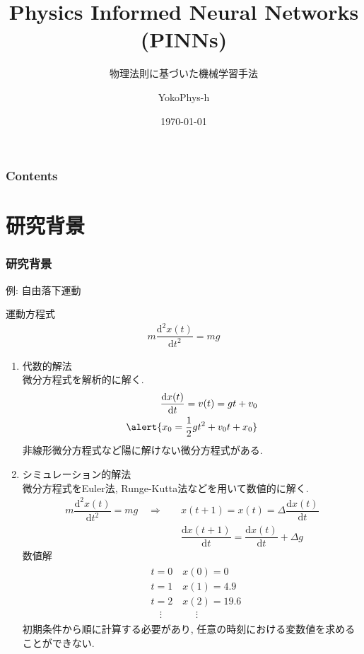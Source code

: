 \documentclass[xcolor=dvipsnames,hyperref={breaklinks=true},mathserif,professionalfont,dvipdfmx,12pt]{beamer}
\title{Physics Informed Neural Networks (PINNs)}
\subtitle{物理法則に基づいた機械学習手法}
\author{YokoPhys-h}
\date{\today}
\institute{hoge大学大学院}
\begin{document}
\begin{frame}[plain]
  \titlepage
\end{frame}
\begin{frame}
  \frametitle{Contents}
  \tableofcontents
\end{frame}

\section{研究背景}

\begin{frame}
  \frametitle{研究背景}
  例: 自由落下運動\cite{_HuaTinoNVIDIASimNetDemoShiwareteiruPhysicsInformed_}

  運動方程式
  \begin{align*}
    m\dfrac{\mathrm{d}^2 x(t)}{\mathrm{d}t^2}=mg
  \end{align*}
  \vspace{-22pt}
  \begin{enumerate}
    \item 代数的解法\\
    微分方程式を解析的に解く. 
    \begin{align*}
      \dfrac{\mathrm{d}x(t)}{\mathrm{d}t}=v(t)=gt+v_0\\
      \alert{x_0=\dfrac{1}{2}gt^2+v_0t+x_0}
    \end{align*}
    非線形微分方程式など陽に解けない微分方程式がある.
  \end{enumerate}
\end{frame} 

\begin{frame}
  \begin{enumerate}
  \setcounter{enumi}{1}
    \item シミュレーション的解法\\
    微分方程式をEuler法, Runge-Kutta法などを用いて数値的に解く. 
    \begin{align*}
      m\dfrac{\mathrm{d}^2 x(t)}{\mathrm{d}t^2}=mg\quad 
       \Rightarrow\quad &x(t+1)=x(t)=\Delta \dfrac{\mathrm{d}x(t)}{\mathrm{d}t}\\
      &\dfrac{\mathrm{d}x(t+1)}{\mathrm{d}t}=\dfrac{\mathrm{d}x(t)}{\mathrm{d}t}+\Delta g
    \end{align*}
    数値解
    \begin{align*}
      \begin{aligned}
        &t=0\quad x(0)=0\\
      &t=1\quad x(1)=4.9\\
      &t=2\quad x(2)=19.6\\
      &\ \ \ \ \vdots\quad\ \ \ \ \ \ \ \ \ \ \  \vdots
      \end{aligned}
    \end{align*}
    初期条件から順に計算する必要があり, 任意の時刻における変数値を求めることができない. 
  \end{enumerate}
\end{frame}
\end{document}
